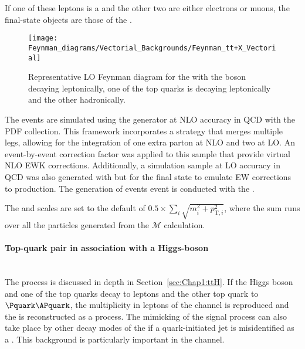 If one of these leptons is a \tauhad and the other two are either electrons or muons, the
final-state objects are those of the \dileptau.

\begin{figure}[h]
\centering
\texttt{[image: Feynman\_diagrams/Vectorial\_Backgrounds/Feynman\_tt+X\_Vectorial]}
\caption{Representative LO Feynman diagram for the \ttZ with the \PZ boson decaying leptonically, one of the top 
quarks is decaying leptonically and the other hadronically. }
\label{fig:tHq:Backgrounds:Feynman_ttZ}
\end{figure}


The \ttW events are simulated using the \SHERPA[2.2.10] generator at 
NLO accuracy in QCD with the \NNPDF[3.0nnlo] PDF collection.
This framework incorporates a strategy that merges multiple legs, 
allowing for the integration of one extra parton at NLO and two at LO.
 An event-by-event correction factor was applied to this sample
that provide virtual NLO EWK corrections. 
Additionally, a simulation sample at LO accuracy in
QCD was also generated with \SHERPA[2.2.10] but for the \ttWj final state to emulate
EW corrections to \ttW production.
The generation of \ttZ events event is conducted with 
the \MGNLO. %

The \muR and \muF scales are set to the default of \(0.5 \times \sum_i \sqrt{m^2_i+p^2_{\text{T},i}}\),
where the sum runs over all the particles generated from the  $\mathcal{M}$ calculation.


\paragraph{Top-quark pair in association with a Higgs-boson }\mbox{}\\
The \ttH process is discussed in depth in Section~\ref{sec:Chap1:ttH}.
If the Higgs boson and one of the top quarks decay to leptons
and the other top quark to $\Pquark\APquark$, the multiplicity in leptons
of the \dileptau channel is reproduced and the \ttH is reconstructed 
as a \tHq process. The mimicking of the signal process can also
take place by other decay modes of the \ttH if a quark-initiated jet
is misidentified as a \tauhad.
This background is particularly important in the \dilepSStau channel.


